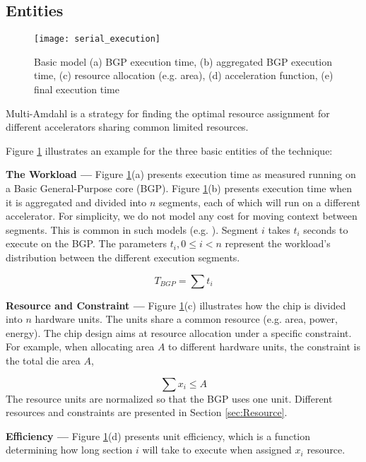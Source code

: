 \documentclass[twocolumn,english]{IEEEtran}
\begin{document}
\subsection{Entities}

\begin{figure}[t]
\texttt{[image: serial\_execution]}

\caption{\label{fig:basic-model}Basic model (a) BGP execution time, (b) aggregated
BGP execution time, (c) resource allocation (e.g. area), (d) acceleration
function, (e) final execution time}
\end{figure}


Multi-Amdahl is a strategy for finding the optimal resource assignment
for different accelerators sharing common limited resources. 

Figure \ref{fig:basic-model} illustrates an example for the three
basic entities of the technique: 

\textbf{The Workload ---} Figure \ref{fig:basic-model}(a) presents
execution time as measured running on a Basic General-Purpose core
(BGP). Figure \ref{fig:basic-model}(b) presents execution time when
it is aggregated and divided into $n$ segments, each of which will
run on a different accelerator. For simplicity, we do not model any
cost for moving context between segments. This is common in such models
(e.g. \cite{hill2008amdahl,ExtendingAmda,Shee08}). Segment $i$ takes
$t_{i}$ seconds to execute on the BGP. The parameters $t_{i},0\leq i<n$
represent the workload's distribution between the different execution
segments.

\[
T_{BGP}=\sum t_{i}\]


\textbf{Resource and Constraint ---} Figure \ref{fig:basic-model}(c)
illustrates how the chip is divided into $n$ hardware units. The
units share a common resource (e.g. area, power, energy). The chip
design aims at resource allocation under a specific constraint. For
example, when allocating area $A$ to different hardware units, the
constraint is the total die area $A$,

\begin{equation}
\sum x_{i}\leq A\label{eq:constraint-static}\end{equation}
The resource units are normalized so that the BGP uses one unit. Different
resources and constraints are presented in Section \ref{sec:Resource}.

\textbf{Efficiency ---} Figure \ref{fig:basic-model}(d) presents
unit efficiency, which is a function determining how long section
$i$ will take to execute when assigned $x_{i}$ resource.
\end{document}
